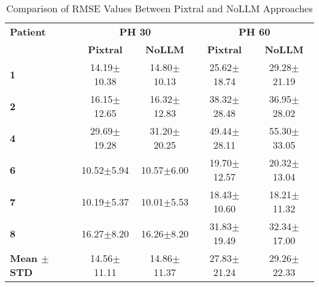 \begin{table}%
\caption{Comparison of RMSE Values Between Pixtral and NoLLM Approaches}
\label{tab:rmse_comparison}
\renewcommand{\arraystretch}{1.3}
\begin{tabular}{|l|cc|cc|}
\hline
\rowcolor{gray!20} \textbf{Patient} & \multicolumn{2}{c|}{\textbf{PH 30}} & \multicolumn{2}{c|}{\textbf{PH 60}} \\
\rowcolor{gray!20} & \textbf{Pixtral} & \textbf{NoLLM} & \textbf{Pixtral} & \textbf{NoLLM} \\
\hline
\rowcolor{gray!10}
\textbf{1} & 14.19$\pm$10.38 & 14.80$\pm$10.13 & 25.62$\pm$18.74 & 29.28$\pm$21.19 \\
\hline
\textbf{2} & 16.15$\pm$12.65 & 16.32$\pm$12.83 & 38.32$\pm$28.48 & 36.95$\pm$28.02 \\
\hline
\rowcolor{gray!10}
\textbf{4} & 29.69$\pm$19.28 & 31.20$\pm$20.25 & 49.44$\pm$28.11 & 55.30$\pm$33.05 \\
\hline
\textbf{6} & 10.52$\pm$5.94 & 10.57$\pm$6.00 & 19.70$\pm$12.57 & 20.32$\pm$13.04 \\
\hline
\rowcolor{gray!10}
\textbf{7} & 10.19$\pm$5.37 & 10.01$\pm$5.53 & 18.43$\pm$10.60 & 18.21$\pm$11.32 \\
\hline
\textbf{8} & 16.27$\pm$8.20 & 16.26$\pm$8.20 & 31.83$\pm$19.49 & 32.34$\pm$17.00 \\
\hline
\rowcolor{gray!20}
\textbf{Mean $\pm$ STD} & 14.56$\pm$11.11 & 14.86$\pm$11.37 & 27.83$\pm$21.24 & 29.26$\pm$22.33 \\
\hline
\end{tabular}
\end{table}